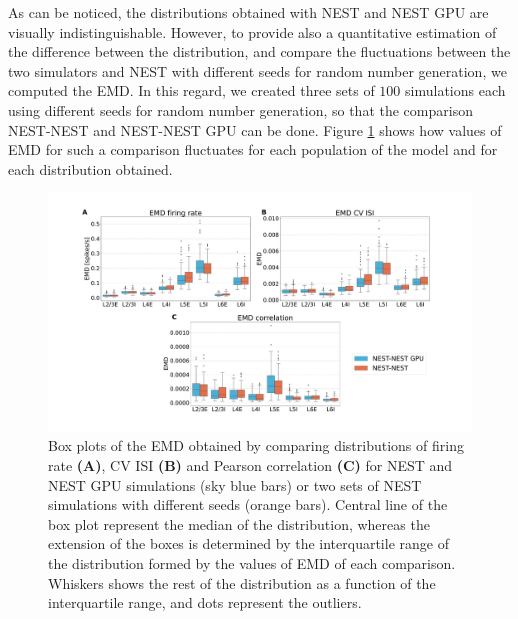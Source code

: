 \documentclass[a4paper, 12pt, twoside, openright]{book}
\begin{document}
As can be noticed, the distributions obtained with NEST and NEST GPU are visually indistinguishable. However, to provide also a quantitative estimation of the difference between the distribution, and compare the fluctuations between the two simulators and NEST with different seeds for random number generation, we computed the EMD. In this regard, we created three sets of $100$ simulations each using different seeds for random number generation, so that the comparison NEST-NEST and NEST-NEST GPU can be done. Figure \ref{fig:emd_cm} shows how values of EMD for such a comparison fluctuates for each population of the model and for each distribution obtained.

\begin{figure}[H]
    \centering
    \includegraphics[trim=6cm 0 6cm 0, clip,width=\columnwidth]{figures/emd_boxplot_cm_NEST_NGPU.pdf}
    \caption{Box plots of the EMD obtained by comparing distributions of firing rate \textbf{(A)}, CV ISI \textbf{(B)} and Pearson correlation \textbf{(C)} for NEST and NEST GPU simulations (sky blue bars) or two sets of NEST simulations with different seeds (orange bars). Central line of the box plot represent the median of the distribution, whereas the extension of the boxes is determined by the interquartile range of the distribution formed by the values of EMD of each comparison. Whiskers shows the rest of the distribution as a function of the interquartile range, and dots represent the outliers.}
    \label{fig:emd_cm}
\end{figure}
\end{document}
